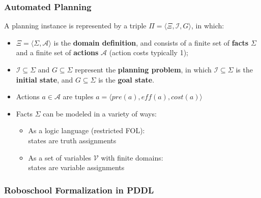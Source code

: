 \documentclass{beamer}
\newcommand{\todo}[1]{ {\color{red} #1} }
\begin{document}
	\begin{frame}[c]\frametitle{Automated Planning}
		\begin{definition} 
			A planning instance is represented by a triple $\Pi = \langle \Xi, \mathcal{I}, G\rangle$, in which:
			\begin{itemize}
				\item $\Xi = \langle \Sigma, \mathcal{A} \rangle$ is the \textbf{domain definition}, and consists of a finite set of \textbf{facts} $\Sigma$ and a finite set of \textbf{actions} $\mathcal{A}$ (action costs typically 1);
				\item $\mathcal{I} \subseteq \Sigma$ and $G \subseteq \Sigma$ represent the \textbf{planning problem}, in which $\mathcal{I} \subseteq \Sigma$ is the \textbf{initial state}, and $G \subseteq \Sigma$ is the \textbf{goal state}.
			\end{itemize}
		\end{definition}
		\begin{itemize}
			\item Actions $a \in \mathcal{A}$ are tuples $a = \langle \mathit{pre}(a), \mathit{eff}(a), \mathit{cost}(a) \rangle$
			\item Facts $\Sigma$ can be modeled in a variety of ways:
			\begin{itemize}
				\item As a logic language (restricted FOL): \\states are truth assignments
				\item As a set of variables $\mathcal{V}$ with finite domains: \\states are variable assignments
			\end{itemize}
		\end{itemize}
	\end{frame}

	\begin{frame}[t]\frametitle{Roboschool Formalization in PDDL}
		\begin{columns}
			\begin{column}[t]{0.6\textwidth}
			
			\end{column}
			\begin{column}[t]{0.4\textwidth}
			
			\end{column}
		\end{columns}
	\end{frame}
	
\end{document}
